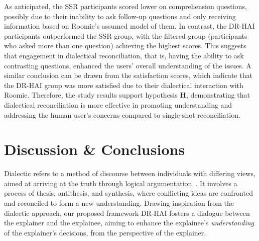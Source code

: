 \documentclass[letterpaper]{article} %
\begin{document}
\begin{table}
\centering
\renewcommand{\arraystretch}{1.1}
\caption{Results of the user study.}
\label{tab:results}
\end{table}



As anticipated, the SSR participants scored lower on comprehension questions, possibly due to their inability to ask follow-up questions and only receiving information based on Roomie's assumed model of them. In contrast, the DR-HAI participants outperformed the SSR group, with the filtered group (participants who asked more than one question) achieving the highest scores. This suggests that engagement in dialectical reconciliation, that is, having the ability to ask contrasting questions, enhanced the users' overall understanding of the issues. A similar conclusion can be drawn from the satisfaction scores, which indicate that the DR-HAI group was more satisfied due to their dialectical interaction with Roomie. Therefore, the study results \mbox{support} hypothesis \textbf{H}, demonstrating that dialectical reconciliation is more effective in promoting understanding and addressing the human user's concerns compared to single-shot reconciliation.



\section{Discussion \& Conclusions}
\label{concl}
Dialectic refers to a method of discourse between individuals with differing views, aimed at arriving at the truth through logical argumentation~\cite{arg_handbook}. It involves a process of thesis, antithesis, and synthesis, where conflicting ideas are confronted and reconciled to form a new understanding. Drawing inspiration from the dialectic approach, our proposed framework DR-HAI fosters a dialogue between the explainer and the explainee, aiming to enhance the explainee's \textit{understanding} of the explainer's decisions, from the perspective of the explainer. 
\end{document}
